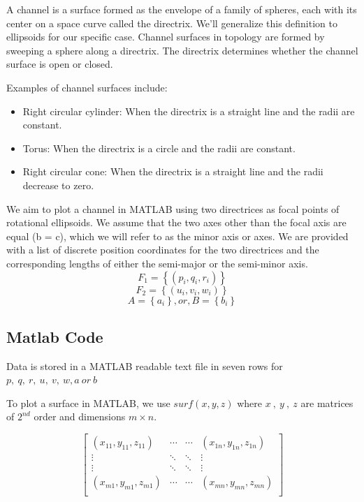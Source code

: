\documentclass[a4paper]{article}
\begin{document}
A channel is a surface formed as the envelope of a family of spheres, each with its center on a space curve called the directrix. We’ll generalize this definition to ellipsoids for our specific case. Channel surfaces in topology are formed by sweeping a sphere along a directrix. The directrix determines whether the channel surface is open or closed.

Examples of channel surfaces include:
\begin{itemize}
    \item Right circular cylinder: When the directrix is a straight line and the radii are constant.
    \item Torus: When the directrix is a circle and the radii are constant.
    \item Right circular cone: When the directrix is a straight line and the radii decrease to zero.
\end{itemize}
We aim to plot a channel in MATLAB using two directrices as focal points of rotational ellipsoids. We assume that the two axes other than the focal axis are equal (b = c), which we will refer to as the minor axis or axes. We are provided with a list of discrete position coordinates for the two directrices and the corresponding lengths of either the semi-major or the semi-minor axis.
\[F_{1} = \left\{ \left( p_{i} , q_{i} , r_{i} \right) \right\}\]
\[F_{2} = \left\{ \left( u_{i} , v_{i} , w_{i} \right) \right\}\]
\[A = \left\{ a_{i} \right\} ,or, B = \left\{ b_{i} \right\}\]

\subsection{Matlab Code}
Data is stored in a MATLAB readable text file in seven rows for
\(p,\ q,\ r,\ u,\ v,\ w,a\ or\ b\)

To plot a surface in MATLAB, we use \(surf(x,y,z)\) where
\(x\ ,\ y\ ,\ z\) are matrices of \(2^{nd}\) order and dimensions
\(m \times n\).

\[\begin{bmatrix}
\left( x_{11} ,  y_{11} ,  z_{11}  \right) & \cdots & \cdots & \left( x_{1n} ,  y_{1n} ,  z_{1n}  \right) \\
 \vdots & \ddots & \ddots & \vdots \\
 \vdots & \ddots & \ddots & \vdots \\
\left(  x_{m1} , y_{m1} ,  z_{m1}  \right) & \cdots & \cdots & \left(  x_{mn} , y_{mn} , z_{mn}  \right) \\
\end{bmatrix}\]
\end{document}
